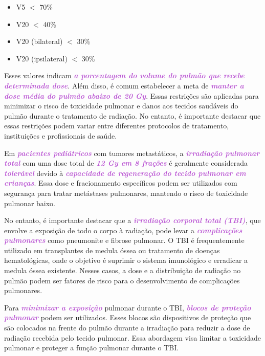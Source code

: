 \documentclass[11pt,a4paper]{article}
\begin{document}
	\begin{itemize}
		\item V5 $<$ 70\%
		\item V20 $<$ 40\%
		\item V20 (bilateral) $<$ 30\%
		\item V20 (ipsilateral) $<$ 30\% 
	\end{itemize}

	Esses valores indicam \textcolor{MediumOrchid}{\textbf{\textit{a porcentagem do volume do pulmão que recebe determinada dose}}}. Além disso, é comum estabelecer a meta de \textcolor{MediumOrchid}{\textbf{\textit{manter a dose média do pulmão abaixo de 20 Gy}}}. Essas restrições são aplicadas para minimizar o risco de toxicidade pulmonar e danos aos tecidos saudáveis do pulmão durante o tratamento de radiação. No entanto, é importante destacar que essas restrições podem variar entre diferentes protocolos de tratamento, instituições e profissionais de saúde.

	Em \textcolor{MediumOrchid}{\textbf{\textit{pacientes pediátricos}}} com tumores metastáticos, a \textcolor{MediumOrchid}{\textbf{\textit{irradiação pulmonar total}}} com uma dose total de \textcolor{MediumOrchid}{\textbf{\textit{12 Gy em 8 frações}}} é geralmente considerada \textcolor{MediumOrchid}{\textbf{\textit{tolerável}}} devido à \textcolor{MediumOrchid}{\textbf{\textit{capacidade de regeneração do tecido pulmonar em crianças}}}. Essa dose e fracionamento específicos podem ser utilizados com segurança para tratar metástases pulmonares, mantendo o risco de toxicidade pulmonar baixo.

	No entanto, é importante destacar que a \textcolor{MediumOrchid}{\textbf{\textit{irradiação corporal total (TBI)}}}, que envolve a exposição de todo o corpo à radiação, pode levar a \textcolor{MediumOrchid}{\textbf{\textit{complicações pulmonares}}} como pneumonite e fibrose pulmonar. O TBI é frequentemente utilizado em transplantes de medula óssea ou tratamento de doenças hematológicas, onde o objetivo é suprimir o sistema imunológico e erradicar a medula óssea existente. Nesses casos, a dose e a distribuição de radiação no pulmão podem ser fatores de risco para o desenvolvimento de complicações pulmonares.

	Para \textcolor{MediumOrchid}{\textbf{\textit{minimizar a exposição}}} pulmonar durante o TBI, \textcolor{MediumOrchid}{\textbf{\textit{blocos de proteção pulmonar }}}podem ser utilizados. Esses blocos são dispositivos de proteção que são colocados na frente do pulmão durante a irradiação para reduzir a dose de radiação recebida pelo tecido pulmonar. Essa abordagem visa limitar a toxicidade pulmonar e proteger a função pulmonar durante o TBI.
\end{document}

